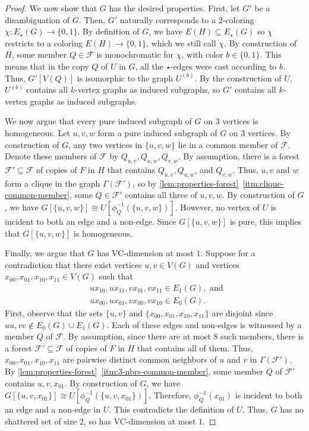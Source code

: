 \documentclass[11pt]{article}
\theoremstyle{remark}
\begin{document}
\begin{proof}
    We now show that $G$ has the desired properties.
    First, let $G'$ be a disambiguation of $G$.
    Then, $G'$ naturally corresponds to a $2$-coloring $\chi : E_\star(G) \to \{0, 1\}$.
    By definition of $G$, we have $E(H) \subseteq E_\star(G)$ so $\chi$ restricts to a coloring $E(H) \to \{0, 1\}$, which we still call $\chi$.
    By construction of $H$, some member $Q \in \mathcal{F}$ is monochromatic for $\chi$, with color $b \in \{0, 1\}$.
    This means that in the copy $Q$ of $U$ in $G$, all the $\star$-edges were cast according to $b$.
    Thus, $G'[V(Q)]$ is isomorphic to the graph $U^{(b)}$.
    By the construction of $U$, $U^{(b)}$ contains all $k$-vertex graphs as induced subgraphs, so $G'$ contains all $k$-vertex graphs as induced subgraphs.
    
    We now argue that every pure induced subgraph of $G$ on $3$ vertices is homogeneous.
    Let $u, v, w$ form a pure induced subgraph of $G$ on $3$ vertices.
    By construction of $G$, any two vertices in $\{u, v, w\}$ lie in a common member of $\mathcal{F}$.
    Denote these members of $\mathcal{F}$ by $Q_{u, v}, Q_{u, w}, Q_{v, w}$.
    By assumption, there is a forest $\mathcal{F}' \subseteq \mathcal{F}$ of copies of $F$ in $H$ that contains $Q_{u, v}, Q_{u, w}$, and $Q_{v, w}$.
    Thus, $u, v$ and $w$ form a clique in the graph $\Gamma(\mathcal{F}')$, so by \cref{lem:properties-forest}~\ref{itm:clique-common-member}, some $Q \in \mathcal{F}'$ contains all three of $u, v, w$.
    By construction of $G$, we have $G[\{u, v, w\}] \cong U[\phi_Q^{-1}(\{u, v, w\})]$.
    However, no vertex of $U$ is incident to both an edge and a non-edge.
    Since $G[\{u, v, w\}]$ is pure, this implies that $G[\{u, v, w\}]$ is homogeneous.
    
    Finally, we argue that $G$ has VC-dimension at most $1$.
    Suppose for a contradiction that there exist vertices $u, v \in V(G)$ and vertices $x_{00},x_{01},x_{10},x_{11} \in V(G)$ such that \begin{align*}
        &ux_{10}, ux_{11}, vx_{01}, vx_{11} \in E_1(G), \text{ and } \\
        &ux_{00}, ux_{01}, vx_{00}, vx_{10} \in E_0(G).
    \end{align*}
    First, observe that the sets $\{u, v\}$ and $\{x_{00}, x_{01}, x_{10}, x_{11}\}$ are disjoint since $uu, vv \notin E_0(G) \cup E_1(G)$.
    Each of these edges and non-edges is witnessed by a member $Q$ of $\mathcal{F}$.
    By assumption, since there are at most $8$ such members, there is a forest $\mathcal{F}' \subseteq \mathcal{F}$ of copies of $F$ in $H$ that contains all of them.
    Thus, $x_{00},x_{01},x_{10},x_{11}$ are pairwise distinct common neighbors of $u$ and $v$ in $\Gamma(\mathcal{F}')$.
    By \cref{lem:properties-forest}~\ref{itm:3-nbrs-common-member}, some member $Q$ of $\mathcal{F}'$ contains $u, v, x_{01}$.
    By construction of $G$, we have $G[\{u, v, x_{01}\}] \cong U[\phi_Q^{-1}(\{u, v, x_{01}\})]$.
    Therefore, $\phi_Q^{-1}(x_{01})$ is incident to both an edge and a non-edge in $U$.
    This contradicts the definition of $U$.
    Thus, $G$ has no shattered set of size $2$, so has VC-dimension at most $1$.
\end{proof}
\end{document}
